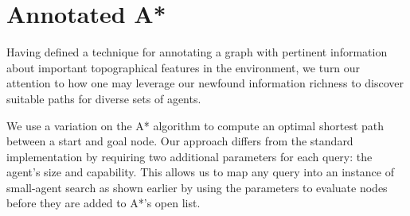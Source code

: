 \section{Annotated A*}
\label{aha:aastar}
Having defined a technique for annotating a graph with pertinent information about important topographical features in the environment, we turn our attention to how one may leverage our newfound information richness to discover suitable paths for diverse sets of agents. 
\par \indent
We use a variation on the A* algorithm \cite{astar} to compute an optimal shortest path between a start and goal node.  
Our approach differs from the standard implementation by requiring two additional parameters for each query: the agent's size and capability. This allows us to map any query into an instance of small-agent search as shown earlier by using the parameters to evaluate nodes before they are added to A*'s open list. 
